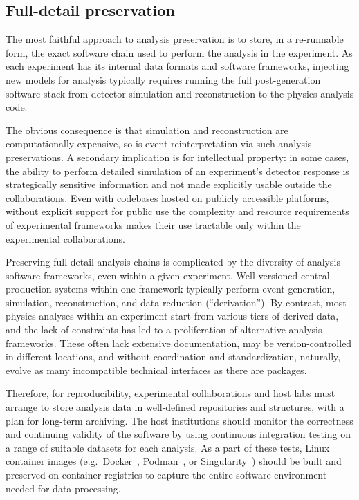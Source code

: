 \documentclass[11pt]{article}
\begin{document}
\subsection{Full-detail preservation}\label{section:full-detail-preservation}

The most faithful approach to analysis preservation is to store, in a re-runnable form, the exact software chain used to perform the analysis in the experiment. As each experiment has its internal data formats and software frameworks, injecting new models for analysis typically requires running the full post-generation software stack from detector simulation and reconstruction to the physics-analysis code.

The obvious consequence is that simulation and reconstruction are computationally expensive, so is event reinterpretation via such analysis preservations. A secondary implication is for intellectual property: in some cases, the ability to perform detailed simulation of an experiment's detector response is strategically sensitive information and not made explicitly usable outside the collaborations. Even with codebases hosted on publicly accessible platforms, without explicit support for public use the complexity and resource requirements of experimental frameworks makes their use tractable only within the experimental collaborations.

Preserving full-detail analysis chains is complicated by the diversity of analysis software frameworks, even within a given experiment.
Well-versioned central production systems within one framework typically perform event generation, simulation, reconstruction, and data reduction (``derivation'').
By contrast, most physics analyses within an experiment start from various tiers of derived data, and the lack of constraints has led to a proliferation of alternative analysis frameworks.
These often lack extensive documentation, may be version-controlled in different locations, and without coordination and standardization, naturally, evolve as many incompatible technical interfaces as there are packages.

Therefore, for reproducibility, experimental collaborations and host labs must arrange to store analysis data in well-defined repositories and structures, with a plan for long-term archiving.
The host institutions should monitor the correctness and continuing validity of the software by using continuous integration testing on a range of suitable datasets for each analysis.
As a part of these tests, Linux container images (e.g.~Docker~\cite{docker}, Podman~\cite{podman}, or Singularity~\cite{singularity}) should be built and preserved on container registries to capture the entire software environment needed for data processing.
\end{document}
